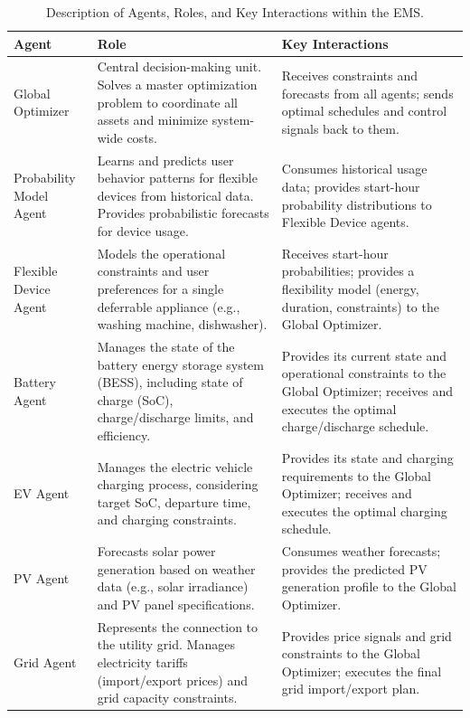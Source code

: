 \documentclass{standalone}
\begin{document}
\begin{table}[H]
\caption{Description of Agents, Roles, and Key Interactions within the EMS.}
\label{tab:agents_and_roles}
\begin{tabular}{>{\raggedright\arraybackslash}p{} >{\raggedright\arraybackslash}p{} >{\raggedright\arraybackslash}p{}}
\toprule 
Agent & Role & Key Interactions \\
\midrule 
Global Optimizer & Central decision-making unit. Solves a master optimization problem to coordinate all assets and minimize system-wide costs. & Receives constraints and forecasts from all agents; sends optimal schedules and control signals back to them. \\
Probability Model Agent & Learns and predicts user behavior patterns for flexible devices from historical data. Provides probabilistic forecasts for device usage. & Consumes historical usage data; provides start-hour probability distributions to Flexible Device agents. \\
Flexible Device Agent & Models the operational constraints and user preferences for a single deferrable appliance (e.g., washing machine, dishwasher). & Receives start-hour probabilities; provides a flexibility model (energy, duration, constraints) to the Global Optimizer. \\
Battery Agent & Manages the state of the battery energy storage system (BESS), including state of charge (SoC), charge/discharge limits, and efficiency. & Provides its current state and operational constraints to the Global Optimizer; receives and executes the optimal charge/discharge schedule. \\
EV Agent & Manages the electric vehicle charging process, considering target SoC, departure time, and charging constraints. & Provides its state and charging requirements to the Global Optimizer; receives and executes the optimal charging schedule. \\
PV Agent & Forecasts solar power generation based on weather data (e.g., solar irradiance) and PV panel specifications. & Consumes weather forecasts; provides the predicted PV generation profile to the Global Optimizer. \\
Grid Agent & Represents the connection to the utility grid. Manages electricity tariffs (import/export prices) and grid capacity constraints. & Provides price signals and grid constraints to the Global Optimizer; executes the final grid import/export plan. \\
\bottomrule 
\end{tabular}
\end{table}
\end{document}
